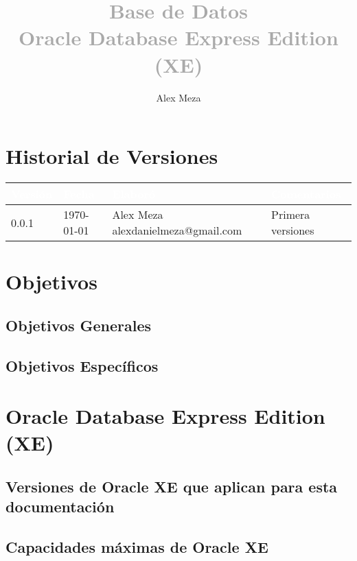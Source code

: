 \documentclass{article}
\title{
  \textbf{
    \Huge
    \textcolor{darkgray}{Base de Datos}
    \\ \vspace{1cm}
    \huge
    \textcolor{darkgray}{Oracle Database Express Edition (XE)}
  }
}
\author{Alex Meza}
\date{\dateEs}
\begin{document}
\maketitle

%
%
%
%
%
\newpage
\tableofcontents

%
%
%
%
%
\newpage
\section{Historial de Versiones}
\vspace{0.5cm}
\begin{tabular}{| p{2cm} | p{3.4cm} | p{4.8cm} | p{5.6cm} |}
  \hline
    \rowcolor{fuchsia700}
    \textcolor{White}{\textbf{Versión}} &
    \textcolor{White}{\textbf{Fecha}} &
    \textcolor{White}{\textbf{Elaboró}} &
    \textcolor{White}{\textbf{Comentarios}}
  \\
  \hline
    0.0.1 &
    \today &
    Alex Meza \newline alexdanielmeza@gmail.com &
    Primera versiones
  \\
  \hline
\end{tabular}

%
%
%
%
%
\newpage
\section{Objetivos}
\subsection{Objetivos Generales}
\subsection{Objetivos Específicos}

%
%
%
%
%
\section{Oracle Database Express Edition (XE)}
\subsection{Versiones de Oracle XE que aplican para esta documentación}
\subsection{Capacidades máximas de Oracle XE}

%
%
%
%
%
\end{document}
